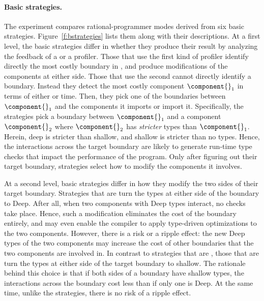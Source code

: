 \paragraph{Basic strategies.}  The experiment compares rational-programmer modes
derived from six basic strategies. Figure~\ref{f:bstrategies} lists them along
with their descriptions.
 At a first level, the basic strategies differ in whether they produce their
 result by analyzing the feedback of a \featkw{} or a \statkw{} profiler.  Those
 that use the first kind of profiler identify directly the most costly boundary
 in \program{}, and produce modifications of the components at either side.
 Those that use the second cannot directly identify a boundary.  Instead they
 detect the most costly component $\component{}_1$ in terms of either \selfkw{}
 or \totalkw{} time.  Then, they pick one of the boundaries between
 $\component{}_1$ and the components it imports or import it.  Specifically, the
 strategies pick a boundary between $\component{}_1$ and a component
 $\component{}_2$ where $\component{}_2$ has \emph{stricter} types than
 $\component{}_1$. Herein, deep is stricter than shallow, and shallow is
 stricter than no types.  Hence, the interactions across the target boundary are
 likely to generate run-time type checks that impact the performance of the
 program.  Only after figuring out their target boundary, \statkw{} strategies
 select how to modify the components it involves.

 At a second level, basic strategies differ in how they modify the two sides of
 their target boundary. Strategies that are \optkw{} turn the types at
 either side of the boundary to Deep. After all, when two components with
 Deep types interact, no checks take place. Hence, such a modification
 eliminates the cost of the boundary entirely, and may even enable the
 compiler to apply type-driven optimizations to the two components. 
 However, there is a risk or
 a ripple effect: the new Deep types of the two components may increase
 the cost of other boundaries that the two components are involved in. In
 contrast to strategies that are \optkw{}, those that are \conkw{} turn
 the types at either side of the target boundary to shallow. The rationale
 behind this choice is that if both sides of a boundary have
 shallow types, the interactions across the boundary cost less than if
 only one is Deep. At the same time, unlike the  \optkw{}
 strategies,  there is no risk of a ripple effect. 

